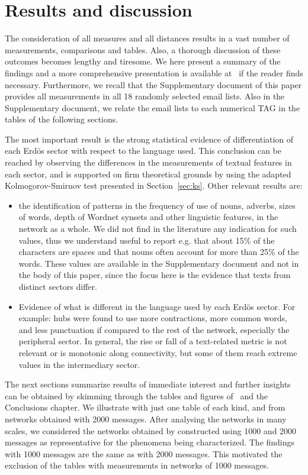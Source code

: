 \documentclass[review]{elsarticle}
\begin{document}
\section{Results and discussion}\label{sres}
The consideration of all measures and all distances results in a vast number of measurements, comparisons and tables.
Also, a thorough discussion of these outcomes becomes lengthy and tiresome.
We here present a summary of the findings and
a more comprehensive presentation is available at~\cite{thesis} if
the reader finds necessary.
Furthermore, we recall that the Supplementary document of this paper provides all measurements in all 18 randomly selected email lists.
Also in the Supplementary document, we relate the email lists to each numerical
TAG in the tables of the following sections.

The most important result is the strong statistical evidence of differentiation of each Erd\"os sector with respect to the language used.
This conclusion can be reached by observing the differences in the measurements of textual features in
each sector, and is supported on firm theoretical grounds by using the adapted Kolmogorov-Smirnov test presented in Section~\ref{sec:ks}.
Other relevant results are:
\begin{itemize}
\item the identification of patterns in the frequency of use of nouns, adverbs, sizes of words, depth of Wordnet synsets and other linguistic features, in the network as a whole.
  We did not find in the literature any indication for such values, thus we understand useful to report e.g. that about 15\% of the characters are spaces and that nouns often account for more than 25\% of the words.
These values are available in the Supplementary document and not in the body of this paper,
since the focus here is the evidence that texts from distinct sectors differ.
\item Evidence of what is different in the language used by each Erd\"os sector. For example: hubs were found to use more contractions,
more common words, and less punctuation if compared to the rest of the network,
especially the peripheral sector.
In general, the rise or fall of a text-related metric is not relevant or is monotonic along connectivity,
but some of them reach extreme values in the intermediary sector.
\end{itemize}

The next sections summarize results of immediate interest
and further insights can be obtained by skimming through
the tables and figures of~\cite{stab,textTables} and the Conclusions chapter.
We illustrate with just one table of each kind,
and from networks obtained with 2000 messages.
After analysing the networks in many scales,
we considered the networks obtained by constructed using 1000 and 2000 messages as representative for the phenomena being characterized.
The findings with 1000 messages are the same as with 2000 messages.
This motivated the exclusion of the tables with measurements in
networks of 1000 messages.
\end{document}
